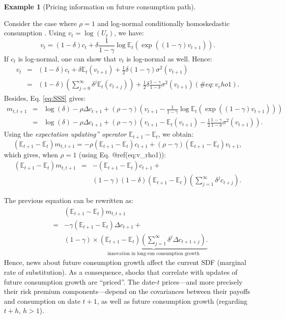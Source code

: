 \documentclass[
  12pt,
]{book}
\theoremstyle{definition}
\theoremstyle{definition}
\newtheorem{example}{Example}[chapter]
\theoremstyle{definition}
\theoremstyle{definition}
\theoremstyle{remark}
\begin{document}
\begin{example}[Pricing information on future consumption path]
\protect\hypertarget{exm:EZpricingInfo}{}\label{exm:EZpricingInfo}

Consider the case where \(\rho = 1\) and log-normal conditionally homoskedastic consumption \citep{Cochrane_2005}. Using \(v_t = \log(U_t)\), we have:
\[
v_t = (1 - \delta) c_t + \delta \frac{1}{1 - \gamma} \log \mathbb{E}_t \left(\exp((1-\gamma)v_{t+1})\right).
\]
If \(c_t\) is log-normal, one can show that \(v_t\) is log-normal as well. Hence:
\begin{eqnarray}
v_t &=& (1 - \delta) c_t + \delta \mathbb{E}_t(v_{t+1}) + \frac{1}{2}\delta (1-\gamma) \sigma^2(v_{t+1})\nonumber \\
&=& (1 - \delta) \left( \sum_{j=0}^{\infty}  \delta^j \mathbb{E}_t (c_{t+j}) \right) + \frac{1}{2}\delta \frac{1-\gamma}{1-\delta} \sigma^2(v_{t+1}) (\#eq:v_rho1).
\end{eqnarray}
Besides, Eq. \eqref{eq:SSS} gives:
\begin{eqnarray*}
m_{t,t+1} &=& \log(\delta) - \rho \Delta c_{t+1} + (\rho - \gamma) \left(v_{t+1} - \frac{1}{1 - \gamma} \log \mathbb{E}_t \left(\exp((1-\gamma)v_{t+1})\right)\right)\\
&=& \log(\delta) - \rho \Delta c_{t+1} + (\rho - \gamma) \left(v_{t+1} - \mathbb{E}_t(v_{t+1}) - \frac{1}{2} \frac{1-\gamma}{1-\delta} \sigma^2(v_{t+1})\right).
\end{eqnarray*}
Using the \emph{expectation updating'' operator} \(\mathbb{E}_{t+1} - \mathbb{E}_t\), we obtain:
\[
(\mathbb{E}_{t+1} - \mathbb{E}_t) m_{t,t+1} = - \rho(\mathbb{E}_{t+1} - \mathbb{E}_t) c_{t+1} + (\rho - \gamma) (\mathbb{E}_{t+1} - \mathbb{E}_t) v_{t+1},
\]
which gives, when \(\rho = 1\) (using Eq. @ref(eq:v\_rho1)):
\begin{eqnarray}
(\mathbb{E}_{t+1} - \mathbb{E}_t) m_{t,t+1} &=& - (\mathbb{E}_{t+1} - \mathbb{E}_t) c_{t+1} +  \\
&& (1 - \gamma)(1 - \delta) (\mathbb{E}_{t+1} - \mathbb{E}_t) \left(  \sum_{j=1}^{\infty}  \delta^j c_{t+j}  \right).\nonumber
\end{eqnarray}

The previous equation can be rewritten as:
\begin{eqnarray}
&& (\mathbb{E}_{t+1} - \mathbb{E}_t) m_{t,t+1} \nonumber \\
&=& - \gamma(\mathbb{E}_{t+1} - \mathbb{E}_t)\Delta c_{t+1} +  \label{eq:sdfAbc}\\
&&  (1 - \gamma) \times \underbrace{ (\mathbb{E}_{t+1} - \mathbb{E}_t) \left(  \sum_{j=1}^{\infty}  \delta^j \Delta c_{t+1+j}  \right).}_{\mbox{innovation in long-run consumption growth}}\nonumber
\end{eqnarray}
Hence, news about future consumption growth affect the current SDF (marginal rate of substitution). As a consequence, shocks that correlate with updates of future consumption growth are ``priced''. The date-\(t\) prices---and more precisely their risk premium components---depend on the covariances between their payoffs and consumption on date \(t+1\), as well as future consumption growth (regarding \(t+h\), \(h>1\)).


\end{example}
\end{document}
